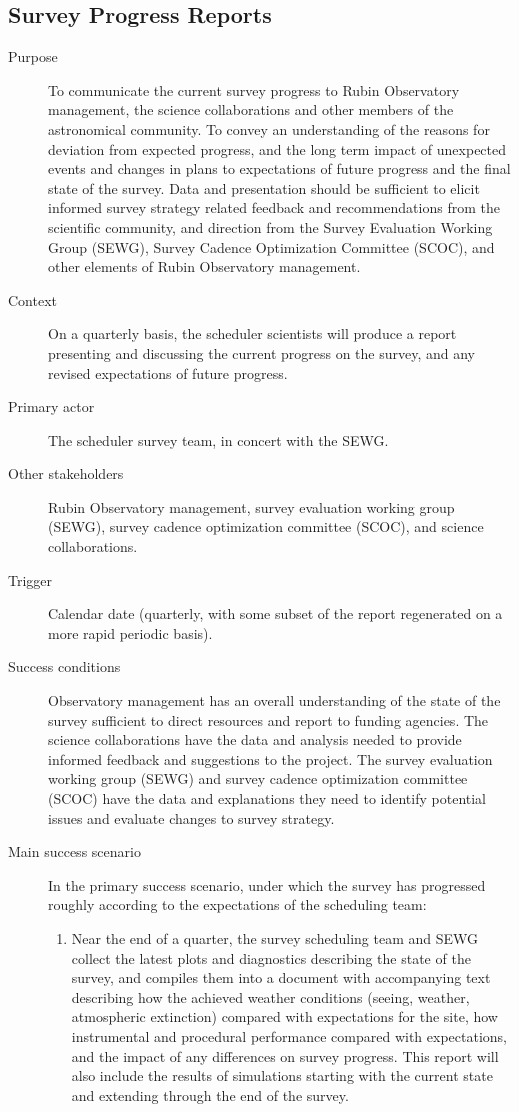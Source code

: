 \subsection{Survey Progress Reports}
\label{sec:org2ae1664}
\begin{description}
\item[{Purpose}] To communicate the current survey progress to Rubin Observatory management, the science collaborations and other members of the astronomical community. To convey an understanding of the reasons for deviation from expected progress, and the long term impact of unexpected events and changes in plans to expectations of future progress and the final state of the survey. Data and presentation should be sufficient to elicit informed survey strategy related feedback and recommendations from the scientific community, and direction from the Survey Evaluation Working Group (SEWG), Survey Cadence Optimization Committee (SCOC), and other elements of Rubin Observatory management.
\item[{Context}] On a quarterly basis, the scheduler scientists will produce a report presenting and discussing the current progress on the survey, and any revised expectations of future progress.
\item[{Primary actor}] The scheduler survey team, in concert with the SEWG.
\item[{Other stakeholders}] Rubin Observatory management, survey evaluation working group (SEWG), survey cadence optimization committee (SCOC), and science collaborations.
\item[{Trigger}] Calendar date (quarterly, with some subset of the report regenerated on a more rapid periodic basis).
\item[{Success conditions}] Observatory management has an overall understanding of the state of the survey sufficient to direct resources and report to funding agencies. The science collaborations have the data and analysis needed to provide informed feedback and suggestions to the project. The survey evaluation working group (SEWG) and survey cadence optimization committee (SCOC) have the data and explanations they need to identify potential issues and evaluate changes to survey strategy.
\item[{Main success scenario}] In the primary success scenario, under which the survey has progressed roughly according to the expectations of the scheduling team:
\begin{enumerate}
\item Near the end of a quarter, the survey scheduling team and SEWG collect the latest plots and diagnostics describing the state of the survey, and compiles them into a document with accompanying text describing how the achieved weather conditions (seeing, weather, atmospheric extinction) compared with expectations for the site, how instrumental and procedural performance compared with expectations, and the impact of any differences on survey progress. This report will also include the results of simulations starting with the current state and extending through the end of the survey.

\end{enumerate}
\end{description}
